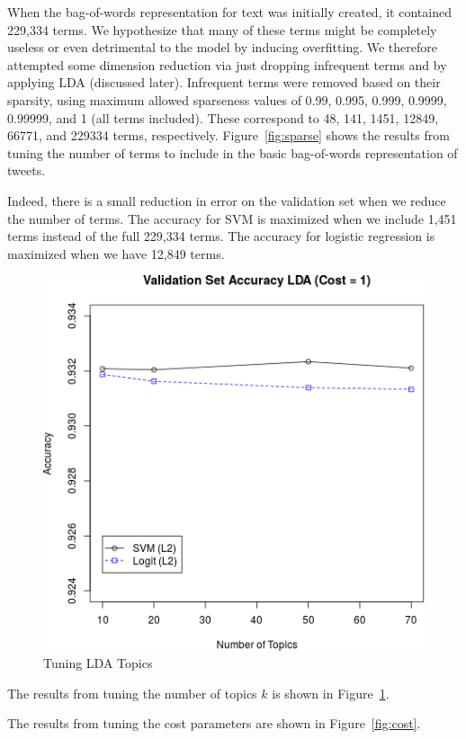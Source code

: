\documentclass{sig-alternate-05-2015}
\begin{document}
When the bag-of-words representation for text was initially created, it contained 229,334 terms. We hypothesize that many of these terms might be completely useless or even detrimental to the model by inducing overfitting. We therefore attempted some dimension reduction via just dropping infrequent terms and by applying LDA (discussed later). Infrequent terms were removed based on their sparsity, using maximum allowed sparseness values of 0.99, 0.995, 0.999, 0.9999, 0.99999, and 1 (all terms included). These correspond to 48, 141, 1451, 12849, 66771, and 229334 terms, respectively. Figure~\ref{fig:sparse} shows the results from tuning the number of terms to include in the basic bag-of-words representation of tweets. 

Indeed, there is a small reduction in error on the validation set when we reduce the number of terms. The accuracy for SVM is maximized when we include 1,451 terms instead of the full 229,334 terms. The accuracy for logistic regression is maximized when we have 12,849 terms.

\begin{figure}
  \centering
  \includegraphics[scale=0.5]{valid_k.png}
  \caption{Tuning LDA Topics}
  \label{fig:LDA}
\end{figure}
The results from tuning the number of topics $k$ is shown in Figure~\ref{fig:LDA}.

The results from tuning the cost parameters are shown in Figure~\ref{fig:cost}.
\end{document}
